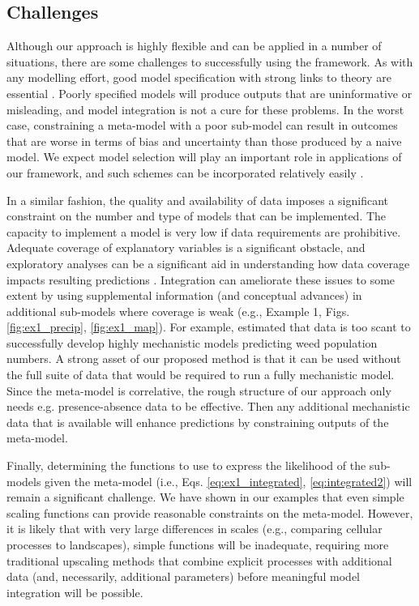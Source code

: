 

\subsection*{Challenges} 
Although our approach is highly flexible and can be applied in a number of situations, there are some challenges to successfully using the framework.
As with any modelling effort, good model specification with strong links to theory are essential \citep{Austin2007}.
Poorly specified models will produce outputs that are uninformative or misleading, and model integration is not a cure for these problems.
In the worst case, constraining a meta-model with a poor sub-model can result in outcomes that are worse in terms of bias and uncertainty than those produced by a naive model.
We expect model selection will play an important role in applications of our framework, and such schemes can be incorporated relatively easily \citep{Madigan1995, Wasserman2000, Tenan2014}.

In a similar fashion, the quality and availability of data imposes a significant constraint on the number and type of models that can be implemented.
The capacity to implement a model is very low if data requirements are prohibitive. 
Adequate coverage of explanatory variables is a significant obstacle, and exploratory analyses can be a significant aid in understanding how data coverage impacts resulting predictions \citep{Mckenney2002}.
Integration can ameliorate these issues to some extent by using supplemental information (and conceptual advances) in additional sub-models where coverage is weak (e.g., Example 1, Figs. \ref{fig:ex1_precip}, \ref{fig:ex1_map}).
For example, \citet{Freckleton2009} estimated that data is too scant to successfully develop highly mechanistic models predicting weed population numbers. 
A strong asset of our proposed method is that it can be used without the full suite of data that would be required to run a fully mechanistic model. 
Since the meta-model is correlative, the rough structure of our approach only needs e.g. presence-absence data to be effective. 
Then any additional mechanistic data that is available will enhance predictions by constraining outputs of the meta-model. 

Finally, determining the functions to use to express the likelihood of the sub-models given the meta-model (i.e., Eqs. \ref{eq:ex1_integrated}, \ref{eq:integrated2}) will remain a significant challenge.
We have shown in our examples that even simple scaling functions can provide reasonable constraints on the meta-model. 
However, it is likely that with very large differences in scales (e.g., comparing cellular processes to landscapes), simple functions will be inadequate, requiring more traditional upscaling methods that combine explicit processes with additional data (and, necessarily, additional parameters) before meaningful model integration will be possible.

